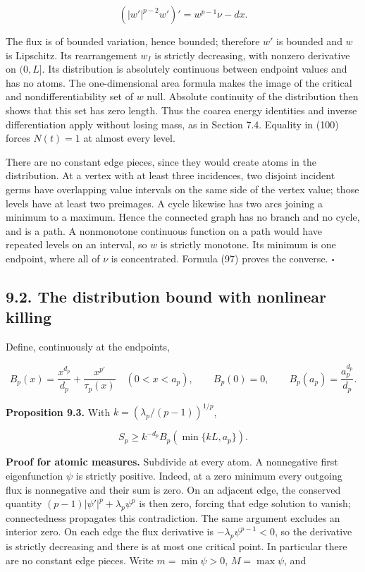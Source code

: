 \documentclass[11pt]{article}
\begin{document}
\[
(|w'|^{p-2}w')'=w^{p-1}\nu-dx.
\tag{101}
\]

The flux is of bounded variation, hence bounded; therefore \(w'\) is
bounded and \(w\) is Lipschitz. Its rearrangement \(w_I\) is strictly
decreasing, with nonzero derivative on \((0,L]\). Its distribution is
absolutely continuous between endpoint values and has no atoms. The
one-dimensional area formula makes the image of the critical and
nondifferentiability set of \(w\) null. Absolute continuity of the
distribution then shows that this set has zero length. Thus the coarea
energy identities and inverse differentiation apply without losing mass,
as in Section 7.4. Equality in (100) forces \(N(t)=1\) at almost every
level.

There are no constant edge pieces, since they would create atoms in the
distribution. At a vertex with at least three incidences, two disjoint
incident germs have overlapping value intervals on the same side of the
vertex value; those levels have at least two preimages. A cycle likewise
has two arcs joining a minimum to a maximum. Hence the connected graph
has no branch and no cycle, and is a path. A nonmonotone continuous
function on a path would have repeated levels on an interval, so \(w\)
is strictly monotone. Its minimum is one endpoint, where all of \(\nu\)
is concentrated. Formula (97) proves the converse. \(\square\)

\subsection{9.2. The distribution bound with nonlinear
killing}\label{the-distribution-bound-with-nonlinear-killing}

Define, continuously at the endpoints,

\[
B_p(x)=\frac{x^{d_p}}{d_p}+\frac{x^{p'}}{\tau_p(x)}
\quad(0<x<a_p),\qquad
B_p(0)=0,\qquad B_p(a_p)=\frac{a_p^{d_p}}{d_p}.
\tag{102}
\]

\textbf{Proposition 9.3.} With \(k=(\lambda_p/(p-1))^{1/p}\),

\[
S_p\ge k^{-d_p}B_p(\min\{kL,a_p\}).
\tag{103}
\]

\textbf{Proof for atomic measures.} Subdivide at every atom. A
nonnegative first eigenfunction \(\psi\) is strictly positive. Indeed,
at a zero minimum every outgoing flux is nonnegative and their sum is
zero. On an adjacent edge, the conserved quantity
\((p-1)|\psi'|^p+\lambda_p\psi^p\) is then zero, forcing that edge
solution to vanish; connectedness propagates this contradiction. The
same argument excludes an interior zero. On each edge the flux
derivative is \(-\lambda_p\psi^{p-1}<0\), so the derivative is strictly
decreasing and there is at most one critical point. In particular there
are no constant edge pieces. Write \(m=\min\psi>0\), \(M=\max\psi\), and
\end{document}
